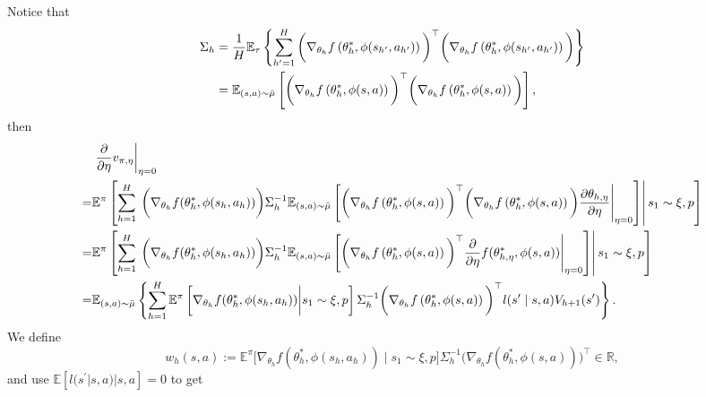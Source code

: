 \documentclass{article}
\numberwithin{equation}{section}
\theoremstyle{plain}
\theoremstyle{definition}
\theoremstyle{remark}
\begin{document}
    Notice that
    \begin{align*}
        \Sigma_h &= \frac{1}{H} \mathbb{E}_{\tau}\left\{\sum_{h^{\prime}=1}^{H}\bigg(\nabla_{\theta_h} f\left(\theta_{h}^*, \phi(s_{h^{\prime}}, a_{h^{\prime}})\right)\bigg)^{\top}\bigg(\nabla_{\theta_h} f\left(\theta_{h}^*, \phi(s_{h^{\prime}}, a_{h^{\prime}})\right)\bigg)\right\} \\
        &= \mathbb{E}_{(s,a) \sim \Bar{\mu}}\left[\bigg(\nabla_{\theta_h} f\left(\theta_{h}^*, \phi(s, a)\right)\bigg)^{\top} \bigg(\nabla_{\theta_h} f\left(\theta_{h}^*, \phi(s, a)\right)\bigg)\right],
    \end{align*}
    then
    \begin{align*}
        &\left.\frac{\partial}{\partial \eta}v_{\pi,\eta}\right|_{\eta = 0}\\
        =& \mathbb{E}^{\pi} \left[\sum_{h=1}^{H} \left.\left.\bigg(\nabla_{\theta_h} f(\theta_{h}^*,\phi(s_h,a_h))\bigg) \Sigma_h^{-1}  \mathbb{E}_{(s,a) \sim \Bar{\mu}}\left[\bigg(\nabla_{\theta_h} f\left(\theta_{h}^*, \phi(s, a)\right)\bigg)^{\top} \bigg(\nabla_{\theta_h} f\left(\theta_{h}^*, \phi(s, a)\right)\bigg) \frac{\partial \theta_{h,\eta}}{\partial \eta}\right|_{\eta = 0} \right]\right| s_1 \sim \xi, p \right]\\
        =& \mathbb{E}^{\pi} \left[\sum_{h=1}^{H} \left.\left.\bigg(\nabla_{\theta_h} f(\theta_{h}^*,\phi(s_h,a_h))\bigg) \Sigma_h^{-1}  \mathbb{E}_{(s,a) \sim \Bar{\mu}}\left[\bigg(\nabla_{\theta_h} f\left(\theta_{h}^*, \phi(s, a)\right)\bigg)^{\top} \frac{\partial}{\partial \eta} f(\theta_{h,\eta}^*,\phi(s,a))\right|_{\eta = 0} \right]\right| s_1 \sim \xi, p \right]\\
        =& \mathbb{E}_{(s,a) \sim \Bar{\mu}} \left\{ \sum_{h=1}^{H} \mathbb{E}^{\pi} \left[\nabla_{\theta_h}f(\theta_{h}^*,\phi(s_h,a_h))\bigg| s_1 \sim \xi, p\right] \Sigma_h^{-1} \bigg(\nabla_{\theta_h} f\left(\theta_{h}^*, \phi(s, a)\right)\bigg)^{\top} l(s^{\prime} \mid s,a) V_{h+1}(s^{\prime}) \right\}.
    \end{align*}
    We define
    \begin{equation*}
        w_h(s,a) := \mathbb{E}^{\pi}\bigg[\nabla_{\theta_h} f\left(\theta_{h}^*, \phi(s_h, a_h)\right) \mid s_{1} \sim \xi, p\bigg] \Sigma_{h}^{-1}\bigg(\nabla_{\theta_h} f\left(\theta_{h}^*, \phi(s, a)\right)\bigg)^{\top} \in \mathbb{R},
    \end{equation*}
    and use $\mathbb{E}\left[l(s^{\prime} | s,a) | s,a\right] = 0$ to get
\end{document}
